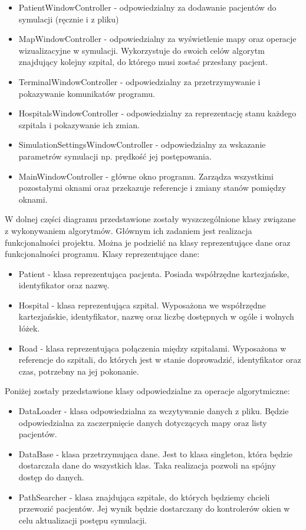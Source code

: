 \documentclass[10pt,a4paper]{article}
\begin{document}
\begin{itemize}
    \item PatientWindowController - odpowiedzialny za dodawanie pacjentów do symulacji (ręcznie i z pliku)
    \item MapWindowController - odpowiedzialny za wyświetlenie mapy oraz operacje wizualizacyjne w symulacji. Wykorzystuje do swoich celów algorytm znajdujący kolejny szpital, do którego musi zostać przesłany pacjent.
    \item TerminalWindowController - odpowiedzialny za przetrzymywanie i pokazywanie komunikatów programu.
    \item HospitalsWindowController - odpowiedzialny za reprezentację stanu każdego szpitala i pokazywanie ich zmian.
    \item SimulationSettingsWindowController - odpowiedzialny za wskazanie parametrów symulacji np. prędkość jej postępowania.
    \item MainWindowController - główne okno programu. Zarządza wszystkimi pozostałymi oknami oraz przekazuje referencje i zmiany stanów pomiędzy oknami.
\end{itemize}
W dolnej części diagramu przedstawione zostały wyszczególnione klasy związane z wykonywaniem algorytmów.
Głównym ich zadaniem jest realizacja funkcjonalności projektu.
Można je podzielić na klasy reprezentujące dane oraz funkcjonalności programu.
Klasy reprezentujące dane:

\begin{itemize}
    \item Patient - klasa reprezentująca pacjenta. Posiada współrzędne kartezjańske, identyfikator oraz nazwę.
    \item Hospital - klasa reprezentująca szpital. Wyposażona we współrzędne kartezjańskie, identyfikator, nazwę oraz liczbę dostępnych w ogóle i wolnych łóżek.
    \item Road - klasa reprezentująca połączenia między szpitalami. Wyposażona w referencje do szpitali, do których jest w stanie doprowadzić, identyfikator oraz czas, potrzebny na jej pokonanie.
\end{itemize}


Poniżej zostały przedstawione klasy odpowiedzialne za operacje algorytmiczne:

\begin{itemize}
    \item DataLoader - klasa odpowiedzialna za wczytywanie danych z pliku. Będzie odpowiedzialna za zaczerpnięcie danych dotyczących mapy oraz listy pacjentów.
    \item DataBase - klasa przetrzymująca dane. Jest to klasa singleton, która będzie dostarczała dane do wszystkich klas. Taka realizacja pozwoli na spójny dostęp do danych.
    \item PathSearcher - klasa znajdująca szpitale, do których będziemy chcieli przewozić pacjentów. Jej wynik będzie dostarczany do kontrolerów okien w celu aktualizacji postępu symulacji.
\end{itemize}
\end{document}
